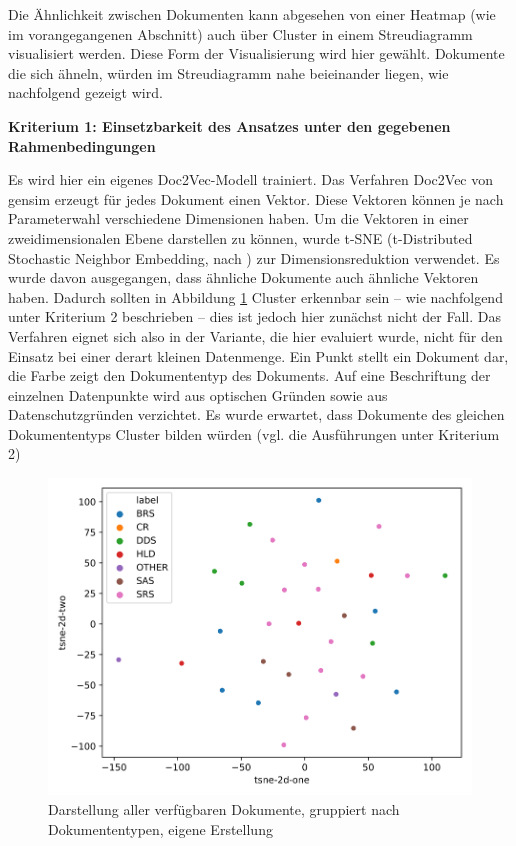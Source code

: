 Die Ähnlichkeit zwischen Dokumenten kann abgesehen von einer Heatmap (wie im vorangegangenen Abschnitt) auch über Cluster in einem Streudiagramm visualisiert werden. Diese Form der Visualisierung wird hier gewählt. Dokumente die sich ähneln, würden im Streudiagramm nahe beieinander liegen, wie nachfolgend gezeigt wird. 

{\bf Kriterium 1: Einsetzbarkeit des Ansatzes unter den gegebenen Rahmenbedingungen}

Es wird hier ein eigenes Doc2Vec-Modell trainiert. Das Verfahren Doc2Vec von gensim erzeugt für jedes Dokument einen Vektor. Diese Vektoren können je nach Parameterwahl verschiedene Dimensionen haben. Um die Vektoren in einer zweidimensionalen Ebene darstellen zu können, wurde t-SNE (t-Distributed Stochastic Neighbor Embedding, nach \cite{t-SNE}) zur Dimensionsreduktion verwendet. Es wurde davon ausgegangen, dass ähnliche Dokumente auch ähnliche Vektoren haben. Dadurch sollten in Abbildung \ref{Abbildung:doc2vec1} Cluster erkennbar sein – wie nachfolgend unter Kriterium 2 beschrieben – dies ist jedoch hier zunächst nicht der Fall. Das Verfahren eignet sich also in der Variante, die hier evaluiert wurde, nicht für den Einsatz bei einer derart kleinen Datenmenge. Ein Punkt stellt ein Dokument dar, die Farbe zeigt den Dokumententyp des Dokuments. Auf eine Beschriftung der einzelnen Datenpunkte wird aus optischen Gründen sowie aus Datenschutzgründen verzichtet. Es wurde erwartet, dass Dokumente des gleichen Dokumententyps Cluster bilden würden (vgl. die Ausführungen unter Kriterium 2)

\begin{figure}[h]
\centering
\includegraphics[scale=0.95]{content/pics/Picture_14.png}
\caption{Darstellung aller verfügbaren Dokumente, gruppiert nach Dokumententypen, eigene Erstellung}
\label{Abbildung:doc2vec1}
\end{figure}

